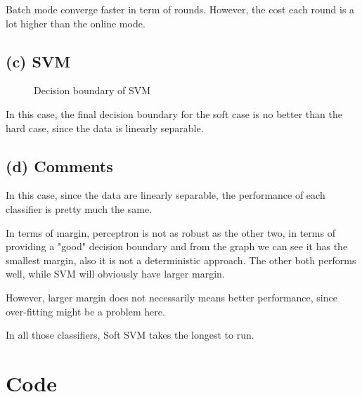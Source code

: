 \documentclass[11pt]{article}
\begin{document}
Batch mode converge faster in term of rounds. However, the cost each round is a lot higher than the online mode.
\pagebreak
\subsection*{(c) SVM}
\begin{figure}[h]
	\centering
	\caption{Decision boundary of SVM}
\end{figure}
In this case, the final decision boundary for the soft case is no better than the hard case, since the data is linearly separable.

\subsection*{(d) Comments}

In this case, since the data are linearly separable, the performance of each classifier is pretty much the same. 

In terms of margin, perceptron is not as robust as the other two, in terms of providing a "good" decision boundary and from the graph we can see it has the smallest margin, also it is not a deterministic approach. The other both performs well, while SVM will obviously have larger margin.

However, larger margin does not necessarily means better performance, since over-fitting might be a problem here.   

In all those classifiers, Soft SVM takes the longest to run.
\pagebreak
\section*{Code}

\inputminted[breaklines]{python}{./py/exercise2.py}
\end{document}
